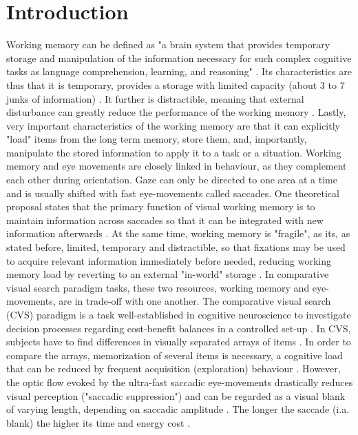 \section{Introduction}
Working memory can be defined as "a brain system that provides temporary storage and manipulation of the information necessary for such complex cognitive tasks as language comprehension, learning, and reasoning" \citep{baddeleyWorkingMemory1992}. Its characteristics are thus that it is temporary, provides a storage with limited capacity (about 3 to 7 junks of information) \citep{diamondExecutiveFunctions2013, bradyWorkingMemoryNot2016}.
It further is distractible, meaning that external disturbance can greatly reduce the performance of the working memory \citep{collinsWorkingDistraction2001}. Lastly, very important characteristics of the working memory are that it can explicitly "load" items from the long term memory, store them, and, importantly, manipulate the stored information to apply it to a task or a situation. 
Working memory and eye movements are closely linked in behaviour, as they complement each other during orientation. Gaze can only be directed to one area at a time and is usually shifted with fast eye-movements called saccades. One theoretical proposal states that the primary function of visual working memory is to maintain information across saccades so that it can be integrated with new information afterwards \citep{hollingworthUnderstandingFunctionVisual2008}. At the same time, working memory is "fragile", as its, as stated before, limited, temporary and distractible, so that fixations may be used to acquire relevant information immediately before needed, reducing working memory load by reverting to an external "in-world" storage \citep{oreganSolvingRealMysteries1992}.
\newline
In comparative visual search paradigm tasks, these two resources, working memory and eye-movements, are in trade-off with one another.
The comparative visual search (CVS) paradigm is a task well-established in cognitive neuroscience to investigate decision processes regarding cost-benefit balances in a controlled set-up \citep{hardiessAllocationCognitiveResources2015}. In CVS, subjects have to find differences in visually separated arrays of items \citep{hardiessHeadEyeMovements2008}. In order to compare the arrays, memorization of several items is necessary, a cognitive load that can be reduced by frequent acquisition (exploration) behaviour \citep{hardiessAllocationCognitiveResources2015}. However, the optic flow evoked by the ultra-fast saccadic eye-movements drastically reduces visual perception ("saccadic suppression") and can be regarded as a visual blank of varying length, depending on saccadic amplitude \citep{bahillMainSequenceTool1975}. The longer the saccade (i.a. blank) the higher its time and energy cost \citep{solman2014balancing}. 
